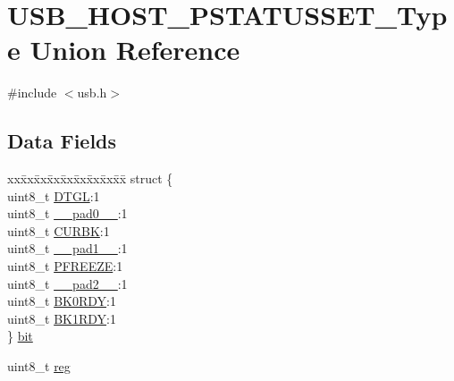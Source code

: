 \hypertarget{union_u_s_b___h_o_s_t___p_s_t_a_t_u_s_s_e_t___type}{}\section{U\+S\+B\+\_\+\+H\+O\+S\+T\+\_\+\+P\+S\+T\+A\+T\+U\+S\+S\+E\+T\+\_\+\+Type Union Reference}
\label{union_u_s_b___h_o_s_t___p_s_t_a_t_u_s_s_e_t___type}


{\ttfamily \#include $<$usb.\+h$>$}

\subsection*{Data Fields}
\begin{DoxyCompactItemize}
\item 
\begin{tabbing}
xx\=xx\=xx\=xx\=xx\=xx\=xx\=xx\=xx\=\kill
struct \{\\
\>uint8\_t \mbox{\hyperlink{union_u_s_b___h_o_s_t___p_s_t_a_t_u_s_s_e_t___type_ae987ff8a18a3bbab4b726b8011064ea3}{DTGL}}:1\\
\>uint8\_t \mbox{\hyperlink{union_u_s_b___h_o_s_t___p_s_t_a_t_u_s_s_e_t___type_a8b4eebe79ded0459acec2f4950102ba3}{\_\_pad0\_\_}}:1\\
\>uint8\_t \mbox{\hyperlink{union_u_s_b___h_o_s_t___p_s_t_a_t_u_s_s_e_t___type_a60af70f2b5f295e7d0fad0cf6c31afb8}{CURBK}}:1\\
\>uint8\_t \mbox{\hyperlink{union_u_s_b___h_o_s_t___p_s_t_a_t_u_s_s_e_t___type_a77f12d2e278bd5c07712648ac0df5e08}{\_\_pad1\_\_}}:1\\
\>uint8\_t \mbox{\hyperlink{union_u_s_b___h_o_s_t___p_s_t_a_t_u_s_s_e_t___type_a5e5a7a11855be531dd9c6eddc438572e}{PFREEZE}}:1\\
\>uint8\_t \mbox{\hyperlink{union_u_s_b___h_o_s_t___p_s_t_a_t_u_s_s_e_t___type_a699d59ec18c35380ea34fd3ffd0fb839}{\_\_pad2\_\_}}:1\\
\>uint8\_t \mbox{\hyperlink{union_u_s_b___h_o_s_t___p_s_t_a_t_u_s_s_e_t___type_ae775e6182e0864ef4c8f1b31e8fc05df}{BK0RDY}}:1\\
\>uint8\_t \mbox{\hyperlink{union_u_s_b___h_o_s_t___p_s_t_a_t_u_s_s_e_t___type_a2bce60d1c409a249682ac9f0abd43e22}{BK1RDY}}:1\\
\} \mbox{\hyperlink{union_u_s_b___h_o_s_t___p_s_t_a_t_u_s_s_e_t___type_a4919564c9bf79b931f06a8a3a545e163}{bit}}\\

\end{tabbing}\item 
uint8\+\_\+t \mbox{\hyperlink{union_u_s_b___h_o_s_t___p_s_t_a_t_u_s_s_e_t___type_a9428adc9af4653a2050e2536b55dec8d}{reg}}
\end{DoxyCompactItemize}


